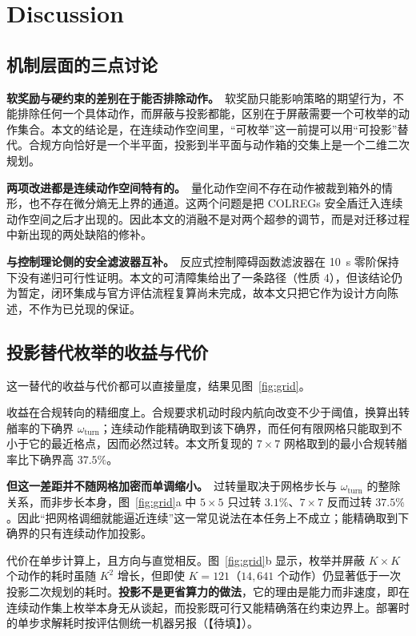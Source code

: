\documentclass[12pt,letterpaper]{article}
\newcommand{\TBD}{【待填】}
\begin{document}
\section{Discussion}

\subsection{机制层面的三点讨论}

\textbf{软奖励与硬约束的差别在于能否排除动作。}\ 软奖励只能影响策略的期望行为，不能排除任何一个具体动作，而屏蔽与投影都能，区别在于屏蔽需要一个可枚举的动作集合。本文的结论是，在连续动作空间里，“可枚举”这一前提可以用“可投影”替代。合规方向恰好是一个半平面，投影到半平面与动作箱的交集上是一个二维二次规划。

\textbf{两项改进都是连续动作空间特有的。}\ 量化动作空间不存在动作被裁到箱外的情形，也不存在微分熵无上界的通道。这两个问题是把 COLREGs 安全盾迁入连续动作空间之后才出现的。因此本文的消融不是对两个超参的调节，而是对迁移过程中新出现的两处缺陷的修补。

\textbf{与控制理论侧的安全滤波器互补。}\ 反应式控制障碍函数滤波器在 10~s 零阶保持下没有递归可行性证明。本文的可清障集给出了一条路径（性质 4），但该结论仍为暂定，闭环集成与官方评估流程复算尚未完成，故本文只把它作为设计方向陈述，不作为已兑现的保证。


\subsection{投影替代枚举的收益与代价}
\label{sec:disc-grid}

这一替代的收益与代价都可以直接量度，结果见图~\ref{fig:grid}。

收益在合规转向的精细度上。合规要求机动时段内航向改变不少于阈值，换算出转艏率的下确界 $\omega_{\mathrm{turn}}$；连续动作能精确取到该下确界，而任何有限网格只能取到不小于它的最近格点，因而必然过转。本文所复现的 $7\times7$ 网格取到的最小合规转艏率比下确界高 $37.5\%$。

\textbf{但这一差距并不随网格加密而单调缩小。}\ 过转量取决于网格步长与 $\omega_{\mathrm{turn}}$ 的整除关系，而非步长本身，图~\ref{fig:grid}a 中 $5\times5$ 只过转 $3.1\%$、$7\times7$ 反而过转 $37.5\%$。因此“把网格调细就能逼近连续”这一常见说法在本任务上不成立；能精确取到下确界的只有连续动作加投影。

代价在单步计算上，且方向与直觉相反。图~\ref{fig:grid}b 显示，枚举并屏蔽 $K\times K$ 个动作的耗时虽随 $K^2$ 增长，但即使 $K=121$（$14{,}641$ 个动作）仍显著低于一次投影二次规划的耗时。\textbf{投影不是更省算力的做法}，它的理由是能力而非速度，即在连续动作集上枚举本身无从谈起，而投影既可行又能精确落在约束边界上。部署时的单步求解耗时按评估侧统一机器另报（\TBD）。
\end{document}

